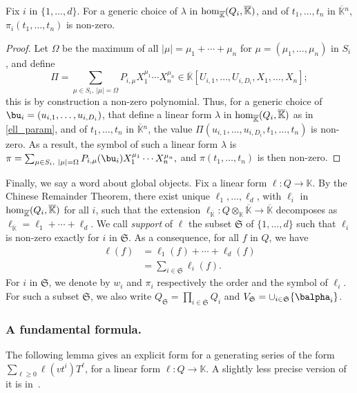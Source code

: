 \documentclass[12pt]{article}
\def\K{\mathbb{K}}
\def\K {\ensuremath{\mathbb{K}}}
\def\Kbar {{\ensuremath{\overline{\mathbb{K}}}}}
\begin{document}
\begin{lemma}\label{lemma:symbol0}
	Fix $i$ in $\{1,\dots,d\}$. For a generic choice of $\lambda$ in ${\rm
		hom}_\Kbar(Q_i,\Kbar)$, and of $t_1,\dots,t_n$ in $\Kbar{}^n$,
	$\pi_i(t_1,\dots,t_n)$ is non-zero.
\end{lemma}
\begin{proof}
	Let $\Omega$ be the maximum of all $|\mu|=\mu_1+\cdots+\mu_n$ for
	$\mu=(\mu_1,\dots,\mu_n)$ in $S_i$, and define 
	$$\Pi =\sum_{\mu \in S_i,\ |\mu|=\Omega}P_{i,\mu} X_1^{\mu_1} \cdots
	X_n^{\mu_n} \in \Kbar[U_{i,1},\dots,U_{i,D_i},X_1,\dots,X_n];$$ this
	is by construction a non-zero polynomial.  Thus, for a generic
	choice of $\bu_i=(u_{i,1},\dots,u_{i,D_i})$, that define a linear form
	$\lambda$ in ${\rm hom}_\Kbar(Q_i,\Kbar)$ as in \cref{ell_param},
	and of $t_1,\dots,t_n$ in $\Kbar{}^n$, the value
	$\Pi(u_{i,1},\dots,u_{i,D_i},t_1,\dots,t_n)$ is non-zero. As a
	result, the symbol of such a linear form $\lambda$ is $\pi =\sum_{\mu \in
		S_i,\ |\mu|=\Omega}P_{i,\mu}(\bu_i) X_1^{\mu_1} \cdots X_n^{\mu_n},$
	and $\pi(t_1,\dots,t_n)$ is then non-zero.
\end{proof}



Finally, we say a word about global objects.  Fix a linear form $\ell:
Q \to \K$. By the Chinese Remainder Theorem, there exist unique
$\ell_1,\dots,\ell_d$, with $\ell_i$ in ${\rm hom}_\Kbar(Q_i,\Kbar)$
for all $i$, such that the extension $\ell_\Kbar: Q\otimes_\K \Kbar
\to \Kbar$ decomposes as $\ell_\Kbar = \ell_1 + \cdots + \ell_d$. We
call {\em support} of $\ell$ the subset $\mathfrak{S}$ of
$\{1,\dots,d\}$ such that $\ell_i$ is non-zero exactly for $i$ in
$\mathfrak{S}$.  As a consequence, for all $f$ in $Q$, we have
\begin{align}\label{eq:fui}
\ell(f) &= \ell_1(f) + \cdots + \ell_d(f)\nonumber\\
&=  \sum_{i \in \mathfrak{S}} \ell_i(f).
\end{align}
For $i$ in $\mathfrak{S}$, we denote by $w_i$ and $\pi_i$ respectively
the order and the symbol of $\ell_i$. For such a subset
$\mathfrak{S}$, we also write $Q_\mathfrak{S}=\prod_{i \in
	\mathfrak{S}} Q_i$ and $V_\mathfrak{S}=\cup_{i \in \mathfrak{S}}
\{\balpha_i\}$.


\subsubsection{A fundamental formula.}  The following lemma 
gives an explicit form for a generating series of the form $\sum_{\ell
	\ge 0} \ell(v t^i)T^\ell$, for a linear form $\ell:Q \to \K$. A
slightly less precise version of it is in~\cite{BoSaSc03}.
\end{document}
